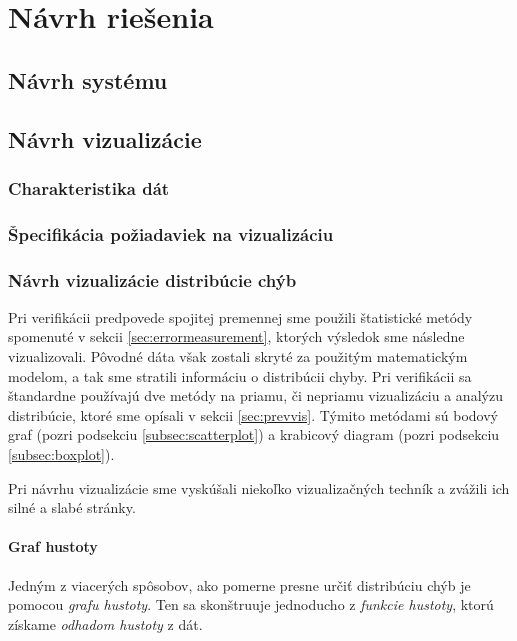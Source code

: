 \chapter{Návrh riešenia}


\section{Návrh systému}

\section{Návrh vizualizácie}

\subsection{Charakteristika dát}

\subsection{Špecifikácia požiadaviek na vizualizáciu}

\subsection{Návrh vizualizácie distribúcie chýb}
Pri verifikácii predpovede spojitej premennej sme použili štatistické metódy spomenuté v sekcii \ref{sec:errormeasurement}, ktorých výsledok sme následne vizualizovali. Pôvodné dáta však zostali skryté za použitým matematickým modelom, a tak sme stratili informáciu o distribúcii chyby. Pri verifikácii sa štandardne používajú dve metódy na priamu, či nepriamu vizualizáciu a analýzu distribúcie, ktoré sme opísali v sekcii \ref{sec:prevvis}. Týmito metódami sú bodový graf (pozri podsekciu \ref{subsec:scatterplot}) a krabicový diagram (pozri podsekciu \ref{subsec:boxplot}).

Pri návrhu vizualizácie sme vyskúšali niekoľko vizualizačných techník a zvážili ich silné a slabé stránky. 

\subsubsection{Graf hustoty} %

Jedným z viacerých spôsobov, ako pomerne presne určiť distribúciu chýb je pomocou \textit{grafu hustoty}. Ten sa skonštruuje jednoducho z \textit{funkcie hustoty}, ktorú získame \textit{odhadom hustoty} z dát. 

